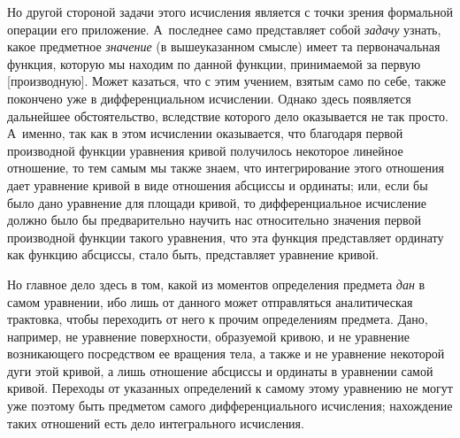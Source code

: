 Но другой стороной задачи этого исчисления является с точки зрения формальной
операции его приложение. А~последнее само представляет собой {\em задачу}
узнать, какое предметное {\em значение} (в вышеуказанном смысле) имеет та
первоначальная функция, которую мы находим по данной функции, принимаемой за
первую [производную]. Может казаться, что с этим учением, взятым само по себе,
также покончено уже в дифференциальном исчислении. Однако здесь появляется
дальнейшее обстоятельство, вследствие которого дело оказывается не так просто.
А~именно, так как в этом исчислении оказывается, что благодаря первой
производной функции уравнения кривой получилось некоторое линейное отношение,
то тем самым мы также знаем, что интегрирование этого отношения дает уравнение
кривой в виде отношения абсциссы и ординаты; или, если бы было дано уравнение
для площади кривой, то дифференциальное исчисление должно было бы
предварительно научить нас относительно значения первой производной функции
такого уравнения, что эта функция представляет ординату как функцию абсциссы,
стало быть, представляет уравнение кривой.

Но главное дело здесь в том, какой из моментов определения предмета {\em дан}
в самом уравнении, ибо лишь от данного может отправляться аналитическая
трактовка, чтобы переходить от него к прочим определениям предмета. Дано,
например, не уравнение поверхности, образуемой кривою, и не уравнение
возникающего посредством ее вращения тела, а также и не уравнение некоторой
дуги этой кривой, а лишь отношение абсциссы и ординаты в уравнении самой
кривой. Переходы от указанных определений к самому этому уравнению не могут уже
поэтому быть предметом самого дифференциального исчисления; нахождение таких
отношений есть дело интегрального исчисления.

